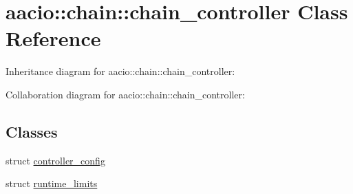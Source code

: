 \hypertarget{classaacio_1_1chain_1_1chain__controller}{}\section{aacio\+:\+:chain\+:\+:chain\+\_\+controller Class Reference}
\label{classaacio_1_1chain_1_1chain__controller}


Inheritance diagram for aacio\+:\+:chain\+:\+:chain\+\_\+controller\+:


Collaboration diagram for aacio\+:\+:chain\+:\+:chain\+\_\+controller\+:
\subsection*{Classes}
\begin{DoxyCompactItemize}
\item 
struct \mbox{\hyperlink{structaacio_1_1chain_1_1chain__controller_1_1controller__config}{controller\+\_\+config}}
\item 
struct \mbox{\hyperlink{structaacio_1_1chain_1_1chain__controller_1_1runtime__limits}{runtime\+\_\+limits}}
\end{DoxyCompactItemize}

